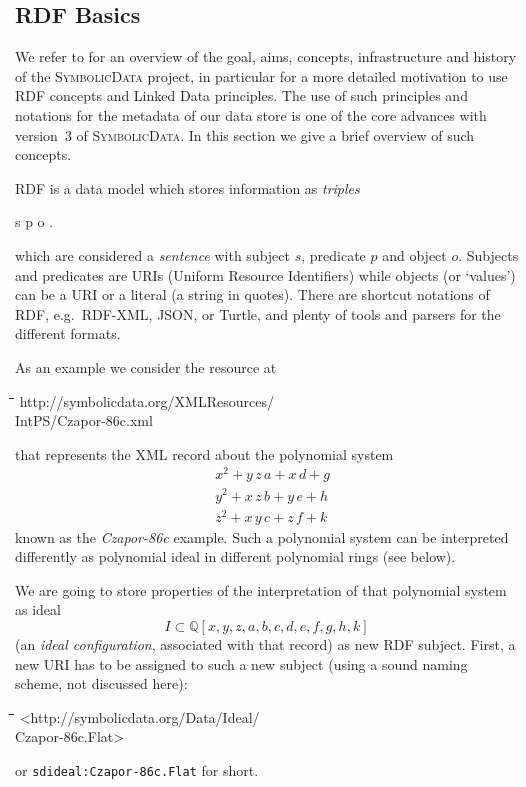 \documentclass[a4paper,11pt]{article}
\def\Ueberschrift#1#2{\section{#1}}
\def\SD{\textsc{SymbolicData}}
\def\eg{e.g.\ }
\newenvironment{code}{\par\small\tt\footnotesize \begin{tabbing}
\hskip12pt\=\hskip12pt\=\hskip12pt\=\hskip12pt\=\hskip5cm\=\hskip5cm\=\kill}
{\end{tabbing}\normalsize}
\begin{document}
\begin{multicols}{2}
\Ueberschrift{RDF Basics}{RDFBasics}

We refer to \cite{cicm-14} for an overview of the goal, aims, concepts,
infrastructure and history of the {\SD} project, in particular for a more
detailed motivation to use RDF concepts and Linked Data principles.  The use
of such principles and notations for the metadata of our data store is one of
the core advances with version~3 of {\SD}. In this section we give a brief
overview of such concepts.
 
RDF is a data model which stores information as 
\emph{triples}
\begin{center}
s \; p \; o \; .
\end{center}
which are considered a \emph{sentence} with subject $s$, predicate $p$ and
object $o$.  Subjects and predicates are URIs (Uniform Resource Identifiers)
while objects (or `values') can be a URI or a literal (a string in quotes).
There are shortcut notations of RDF, \eg RDF-XML, JSON, or Turtle, and plenty
of tools and parsers for the different formats.

As an example we consider the resource at
\begin{code}
  http://symbolicdata.org/XMLResources/\\\> IntPS/Czapor-86c.xml
\end{code}
that represents the XML record about the polynomial system
\begin{align*}
 & x^2 + y\,z\,a + x\,d + g\\
 & y^2 + x\,z\,b + y\,e + h\\
 & z^2 + x\,y\,c + z\,f + k
\end{align*}
known as the \emph{Czapor-86c} example.  Such a polynomial system can be
interpreted differently as polynomial ideal in different polynomial rings (see
below).

We are going to store properties of the interpretation of that polynomial
system as ideal
$$
  I\subset \mathbb{Q}[x,y,z,a,b,c,d,e,f,g,h,k]
$$
(an \emph{ideal configuration}, associated with that record) as new RDF
subject.  First, a new URI has to be assigned to such a new subject
(using a sound naming scheme, not discussed here):
\begin{code}
<http://symbolicdata.org/Data/Ideal/\\\> Czapor-86c.Flat>
\end{code}
or \texttt{sdideal:Czapor-86c.Flat} for short.


\end{multicols}
\end{document}
